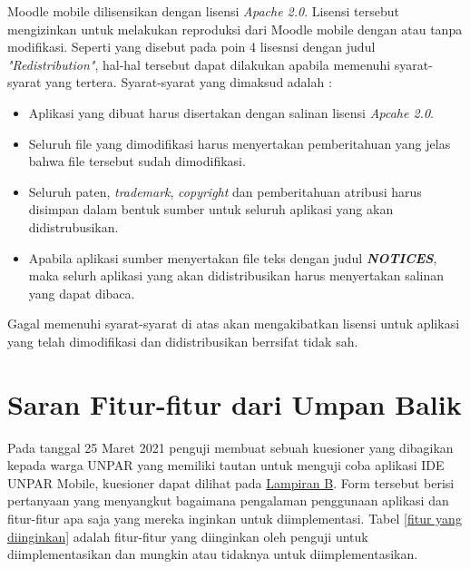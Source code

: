 Moodle mobile dilisensikan dengan lisensi \textit{Apache 2.0}\cite{Moodlemobile:license}. Lisensi tersebut mengizinkan untuk melakukan reproduksi dari Moodle mobile dengan atau tanpa modifikasi. Seperti yang disebut pada poin 4 lisesnsi dengan judul \textit{"Redistribution"}, hal-hal tersebut dapat dilakukan apabila memenuhi syarat-syarat yang tertera. Syarat-syarat yang dimaksud adalah :
\begin{itemize}
\item Aplikasi yang dibuat harus disertakan dengan salinan lisensi \textit{Apcahe 2.0}.
\item Seluruh file yang dimodifikasi harus menyertakan pemberitahuan yang jelas bahwa file tersebut sudah dimodifikasi.
\item Seluruh paten, \textit{trademark}, \textit{copyright} dan pemberitahuan atribusi harus disimpan dalam bentuk sumber untuk seluruh aplikasi yang akan didistrubusikan.
\item Apabila aplikasi sumber menyertakan file teks dengan judul \textit{\textbf{NOTICES}}, maka selurh aplikasi yang akan didistribusikan harus menyertakan salinan yang dapat dibaca.
\end{itemize}
Gagal memenuhi syarat-syarat di atas akan mengakibatkan lisensi untuk aplikasi yang telah dimodifikasi dan didistribusikan berrsifat tidak sah.

\section{Saran Fitur-fitur dari Umpan Balik}
\label{feature feedback}

Pada tanggal 25 Maret 2021 penguji membuat sebuah kuesioner yang dibagikan kepada warga UNPAR yang memiliki tautan untuk menguji coba aplikasi IDE UNPAR Mobile, kuesioner dapat dilihat pada \hyperref[lamp:B]{Lampiran B}. Form tersebut berisi pertanyaan yang menyangkut bagaimana pengalaman penggunaan aplikasi dan fitur-fitur apa saja yang mereka inginkan untuk diimplementasi. Tabel \ref{fitur yang diinginkan} adalah fitur-fitur yang diinginkan oleh penguji untuk diimplementasikan dan mungkin atau tidaknya untuk diimplementasikan.

